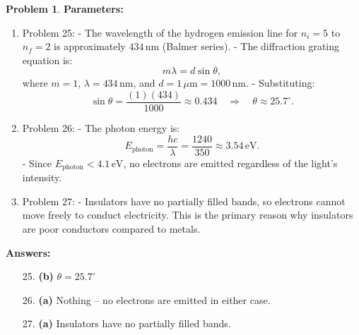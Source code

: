 \documentclass[12pt]{article}
\theoremstyle{definition} %
\newtheorem{problem}{Problem}
\theoremstyle{plain} %
\begin{document}
\begin{problem}
    \textbf{Parameters:}
    \begin{enumerate}
        \item Problem 25:
        - The wavelength of the hydrogen emission line for \(n_i = 5\) to \(n_f = 2\) is approximately \(434 \, \text{nm}\) (Balmer series).
        - The diffraction grating equation is:
        $$
        m\lambda = d \sin\theta,
        $$
        where \(m = 1\), \(\lambda = 434 \, \text{nm}\), and \(d = 1 \, \mu\text{m} = 1000 \, \text{nm}\).
        - Substituting:
        $$
        \sin\theta = \frac{(1)(434)}{1000} \approx 0.434 \quad \Rightarrow \quad \theta \approx 25.7^\circ.
        $$
    
        \item Problem 26:
        - The photon energy is:
        $$
        E_{\text{photon}} = \frac{hc}{\lambda} = \frac{1240}{350} \approx 3.54 \, \text{eV}.
        $$
        - Since \(E_{\text{photon}} < 4.1 \, \text{eV}\), no electrons are emitted regardless of the light's intensity.
    
        \item Problem 27:
        - Insulators have no partially filled bands, so electrons cannot move freely to conduct electricity. This is the primary reason why insulators are poor conductors compared to metals.
    \end{enumerate}
    
    \textbf{Answers:}
    \begin{enumerate}
        \item[25.] \textbf{(b)} \(\theta = 25.7^\circ\)
        \item[26.] \textbf{(a)} Nothing – no electrons are emitted in either case.
        \item[27.] \textbf{(a)} Insulators have no partially filled bands.
    \end{enumerate}
\end{problem}
\end{document}

